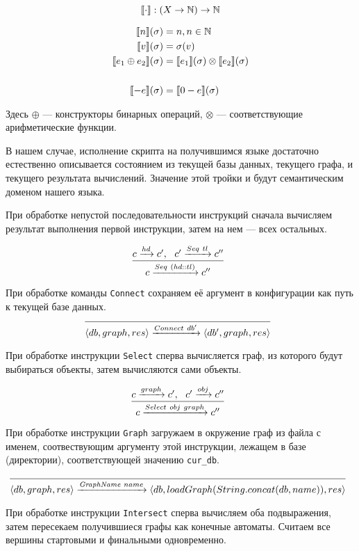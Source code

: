 $$\llbracket \cdot \rrbracket : (X \rightarrow \mathbb{N}) \rightarrow \mathbb{N}$$


\begin{align*}
  \llbracket n \rrbracket(\sigma) &= n, n \in \mathbb{N} \\
  \llbracket v \rrbracket(\sigma) &= \sigma(v) \\
  \llbracket e_1 \oplus e_2 \rrbracket(\sigma) &= \llbracket e_1 \rrbracket(\sigma) \otimes \llbracket e_2 \rrbracket(\sigma) \\
  & \\
  \llbracket -e \rrbracket(\sigma) &= \llbracket 0-e \rrbracket(\sigma)
\end{align*}

Здесь $\oplus$ --- конструкторы бинарных операций, $\otimes$ --- соответствующие арифметические функции.

В нашем случае, исполнение скрипта на получившимся языке достаточно естественно описывается состоянием из текущей базы данных, текущего графа, и текущего результата вычислений. Значение этой тройки и будут семантическим доменом нашего языка.

При обработке непустой последовательности инструкций сначала вычисляем результат выполнения первой инструкции, затем на нем --- всех остальных.

$$
\infer[]{c \xrightarrow{Seq \ (hd::tl)} c''}{c \xrightarrow{hd} c', \ \ c' \xrightarrow{Seq \ tl} c''}
$$

При обработке команды \verb|Connect| сохраняем её аргумент в конфигурации как путь к текущей базе данных.
$$
\infer[]{\langle db, graph, res\rangle \xrightarrow{Connect \ db'} \langle db', graph, res\rangle}{}
$$

При обработке инструкции \verb|Select| сперва вычисляется граф, из которого будут выбираться объекты, затем вычисляются сами объекты.

$$
\infer[]{c \xrightarrow{Select \ obj \ graph} c''}{c \xrightarrow{graph} c', \ \ c' \xrightarrow{obj} c''}
$$

При обработке инструкции \verb|Graph| загружаем в окружение граф из файла с именем, соотвествующим аргументу этой инструкции, лежащем в базе (директории), соответствующей значению \verb|cur_db|.

$$
\infer[]{\langle db, graph, res \rangle \xrightarrow{\textit{GraphName} \ name} \langle db ,loadGraph(String.concat(db,name)), res\rangle}{}
$$

При обработке инструкции \verb|Intersect| сперва вычисляем оба подвыражения, затем пересекаем получившиеся графы как конечные автоматы. Считаем все вершины стартовыми и финальными одновременно.

